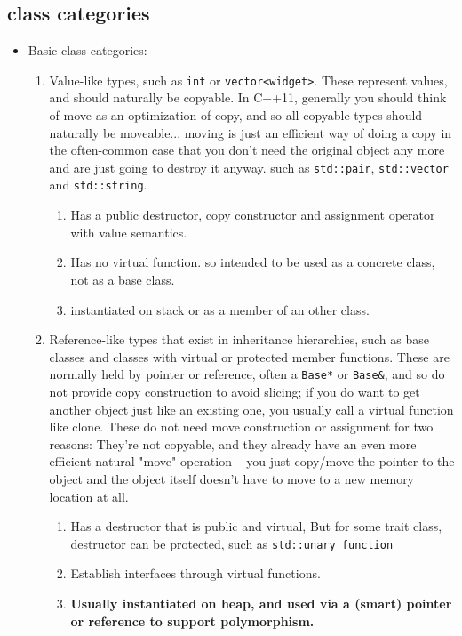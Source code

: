 \documentclass[a4paper,11pt,twoside]{book}
\begin{document}
\subsection{class categories}
\begin{itemize}
	\item Basic class categories:
	\begin{enumerate}
			
		\item Value-like types, such as \texttt{int} or \texttt{vector<widget>}. These represent values, and should naturally be copyable. In C++11, generally you should think of move as an optimization of copy, and so all copyable types should naturally be moveable... moving is just an efficient way of doing a copy in the often-common case that you don't need the original object any more and are just going to destroy it anyway. such as \texttt{std::pair}, \texttt{std::vector} and \texttt{std::string}.
		
		\begin{enumerate}
			\item Has a public destructor, copy constructor and assignment operator with value semantics.
			\item Has no virtual function. so intended to be used as a concrete class, not as a base class.
			\item instantiated on stack or as a member of an other class.
		\end{enumerate}
		
		\item Reference-like types that exist in inheritance hierarchies, such as base classes and classes with virtual or protected member functions. These are normally held by pointer or reference, often a \texttt{Base*} or \texttt{Base\&}, and so do not provide copy construction to avoid slicing; if you do want to get another object just like an existing one, you usually call a virtual function like clone. These do not need move construction or assignment for two reasons: They're not copyable, and they already have an even more efficient natural "move" operation -- you just copy/move the pointer to the object and the object itself doesn't have to move to a new memory location at all.
		\begin{enumerate}
			\item Has a destructor that is public and virtual, But for some trait class, destructor can be protected, such as \texttt{std::unary\_function}
            \item Establish interfaces through virtual functions.
			\item \textbf{Usually instantiated on heap, and used via a (smart) pointer or reference to support polymorphism.} 
        \end{enumerate}
		


\end{enumerate}
\end{itemize}
\end{document}
